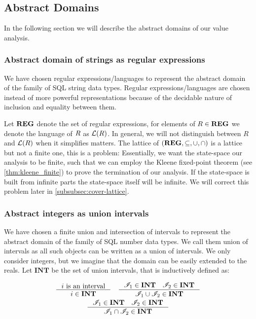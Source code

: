\subsection{Abstract Domains}\label{subsec:abstract-domains}

In the following section we will describe the abstract domains of our value analysis.

\subsubsection{Abstract domain of strings as regular expressions}\label{subsubsec:abstract_domains_strings}
We have chosen regular expressions/languages to represent the abstract domain of the family of SQL string data types.
Regular expressions/languages are chosen instead of more powerful representations because of the decidable nature of inclusion and equality between them.

Let $\mathbf{REG}$ denote the set of regular expressions, for elements of $R \in \mathbf{REG}$ we denote the language of $R$ as $\mathcal{L}(R)$.
In general, we will not distinguish between $R$ and $\mathcal{L}(R)$ when it simplifies matters.
The lattice of $(\mathbf{REG}, \subseteq, \cup, \cap)$ is a lattice but not a finite one, this is a problem: Essentially, we want the state-space our analysis to be finite, such that we can employ the Kleene fixed-point theorem (see \autoref{thm:kleene_finite}) to prove the termination of our analysis.
If the state-space is built from infinite parts the state-space itself will be infinite.
We will correct this problem later in \autoref{subsubsec:cover-lattice}.

\subsubsection{Abstract integers as union intervals}\label{subsubsec:abstract_domains_numbers} We have chosen a finite union and intersection of intervals to represent the abstract domain of the family of SQL number data types.
We call them union of intervals as all such objects can be written as a union of intervals.
We only consider integers, but we imagine that the domain can be easily extended to the reals.
Let $\mathbf{INT}$ be the set of union intervals, that is inductively defined as:


\begin{gather*}
    \inference{i \text{ is an interval}}{i \in \mathbf{INT}} \quad
    \inference{\mathscr{I}_1 \in \textbf{INT} \quad \mathscr{I}_2 \in \textbf{INT}}{\mathscr{I}_1 \cup  \mathscr{I}_2 \in \mathbf{INT}}\\
    \inference{\mathscr{I}_1 \in \textbf{INT} \quad \mathscr{I}_2 \in \textbf{INT}}{\mathscr{I}_1 \cap  \mathscr{I}_2 \in \mathbf{INT}}
\end{gather*}


